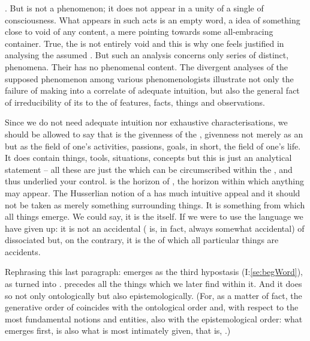 . But  is not a phenomenon;
it does not appear in a unity of a single  of consciousness. What 
appears in such acts is an empty word, a  idea of something 
close to void of any content, a mere  pointing towards some
all-embracing container. True, the  is not entirely void and this is why 
one feels justified in analysing the assumed . But such an 
analysis concerns only series of distinct,  phenomena. 
Their  has no phenomenal content.
The divergent analyses of the supposed phenomenon among various phenomenologists
illustrate not only the failure of making  into a correlate of
adequate intuition, but also the general fact of irreducibility of its 
 to the  of features, facts, things and
observations. 


\pa
Since we do not need adequate intuition nor exhaustive characterisations, we
should be allowed to say that  is the  
givenness of the , givenness not merely as an 
 but as the 
field of one's activities, passions, goals, in short, the field of one's life. It does 
contain {things}, tools, situations, concepts but this is just an analytical 
statement --  all these are just the  which can be 
circumscribed within the \hoa, and thus underlied your control. 
 is the horizon of , 
the horizon within which anything  may appear. 
The Husserlian notion of a  has much intuitive appeal and it should
not be taken as merely something surrounding  things. It is
something from which all  things emerge. We could say, it is the 
 itself. If we were to use the language we have given up: it is
not an accidental  ( is, 
in fact, always somewhat accidental) of dissociated  but, on the
contrary, it is the  of which all particular things are accidents. 


Rephrasing this last paragraph:  emerges as the third hypostasis
(I:\ref{se:begWord}), as  turned into 
.  precedes all the things which we later find
within it. And it does so not only ontologically but also epistemologically.
(For, as a matter of fact, the generative order of  coincides with
the ontological order and, with respect to the most fundamental notions and
entities, also with the epistemological order: what emerges first, is also what
is most intimately given, that is, .)

